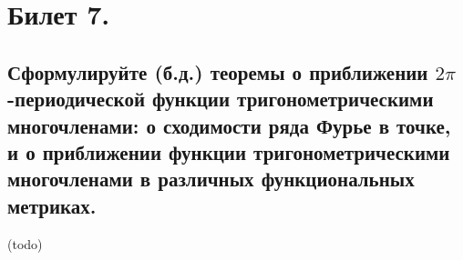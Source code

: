 \section{Билет 7.}

\subsection{Сформулируйте (б.д.) теоремы о приближении $2\pi$-периодической функции тригонометрическими многочленами: о сходимости ряда Фурье в точке, и о приближении функции тригонометрическими многочленами в различных функциональных метриках.}
(todo)